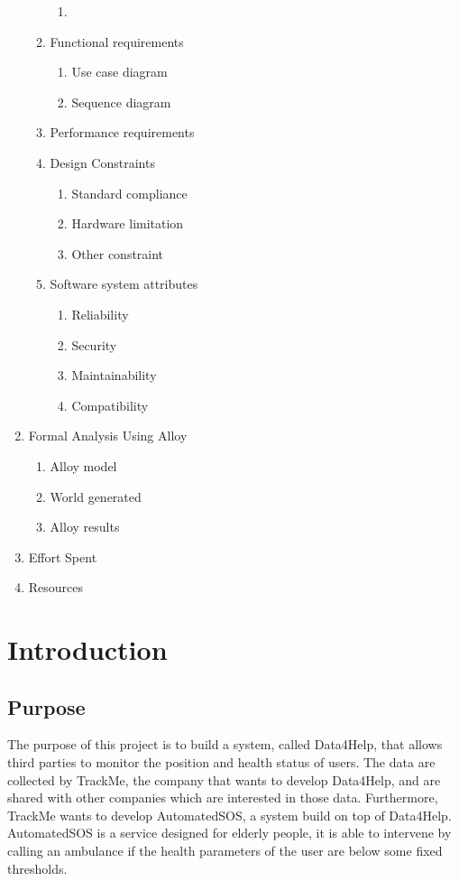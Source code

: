 \documentclass{article}
\begin{document}
\begin{enumerate}
\begin{enumerate}
				\begin{enumerate}
					\item
				\end{enumerate}
				\item Functional requirements
				\begin{enumerate}
					\item Use case diagram
					\item Sequence diagram
				\end{enumerate}
				\item Performance requirements
				\item Design Constraints
				\begin{enumerate}
					\item Standard compliance
					\item Hardware limitation
					\item Other constraint
				\end{enumerate}
				\newpage
				\item Software system attributes
				\begin{enumerate}
					\item Reliability
					\item Security
					\item Maintainability
					\item Compatibility
				\end{enumerate}
			\end{enumerate}
			\item Formal Analysis Using Alloy
			\begin{enumerate}
				\item Alloy model
				\item World generated
				\item Alloy results
			\end{enumerate}
			\item Effort Spent
			\item Resources
	\end{enumerate}
	\newpage
\section{Introduction}
\subsection{Purpose}
The purpose of this project is to build a system, called Data4Help, that allows third parties to monitor the position and health status of users. The data are collected by TrackMe, the company that wants to develop Data4Help, and are shared with other companies which are interested in those data.
Furthermore, TrackMe wants to develop AutomatedSOS, a system build on top of Data4Help. AutomatedSOS is a service designed for elderly people, it is able to intervene by calling an ambulance if the health parameters of the user are below some fixed thresholds.
\end{document}
